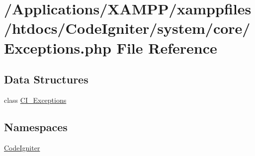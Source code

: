 \hypertarget{_exceptions_8php}{}\section{/\+Applications/\+X\+A\+M\+P\+P/xamppfiles/htdocs/\+Code\+Igniter/system/core/\+Exceptions.php File Reference}
\label{_exceptions_8php}
\subsection*{Data Structures}
\begin{DoxyCompactItemize}
\item 
class \mbox{\hyperlink{class_c_i___exceptions}{C\+I\+\_\+\+Exceptions}}
\end{DoxyCompactItemize}
\subsection*{Namespaces}
\begin{DoxyCompactItemize}
\item 
 \mbox{\hyperlink{namespace_code_igniter}{Code\+Igniter}}
\end{DoxyCompactItemize}
